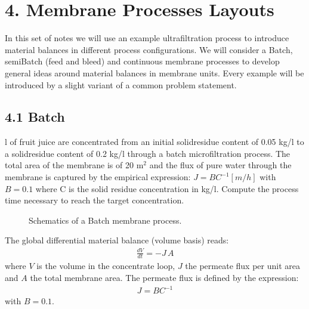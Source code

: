 \documentclass[letterpaper,10pt,english]{jupyterBook}
\let\sphinxpxdimen\pdfpxdimen\else\newdimen\sphinxpxdimen
\begin{document}
\section{4. Membrane Processes Layouts}
\label{\detokenize{Process_layouts:membrane-processes-layouts}}\label{\detokenize{Process_layouts::doc}}
\sphinxAtStartPar
In this set of notes we will use an example ultrafiltration process to introduce material balances in different process configurations. We will consider a Batch, semi\sphinxhyphen{}Batch (feed and bleed) and continuous membrane processes to develop general ideas around material balances in membrane units. Every example will be introduced by a slight variant of a common problem statement.


\subsection{4.1 Batch}
\label{\detokenize{Process_layouts:batch}}
\sphinxAtStartPar
{}

 l of fruit juice are concentrated from an initial solid\sphinxhyphen{}residue content of 0.05 kg/l to a solid\sphinxhyphen{}residue content of 0.2 kg/l through a batch microfiltration process. The total area of the membrane is of 20 \(\mathrm{m^2}\) and the flux of pure water through the membrane is captured by the empirical expression: \(J=BC^{-1} [m/h]\) with \(B=0.1\) where C is the solid residue concentration in kg/l. Compute the process time necessary to reach the target concentration.

\begin{figure}[htbp]
\centering
\capstart

\noindent\sphinxincludegraphics[height=300\sphinxpxdimen]{{batch}.png}
\caption{Schematics of a Batch membrane process.}\label{\detokenize{Process_layouts:scheme}}\end{figure}

\sphinxAtStartPar
{}

\sphinxAtStartPar
The global differential material balance (volume basis) reads:
\begin{equation}\label{equation:Process_layouts:PLYeq1}
\begin{split}
\frac{dV}{dt}=-J\,A
\end{split}
\end{equation}
\sphinxAtStartPar
where \(V\) is the volume in the concentrate loop, \(J\) the permeate flux per unit area and \(A\) the total membrane area.
The permeate flux is defined by the expression:
\begin{equation}\label{equation:Process_layouts:PLYeq2}
\begin{split}
J=BC^{-1}
\end{split}
\end{equation}
\sphinxAtStartPar
with \(B=0.1\).
\end{document}
